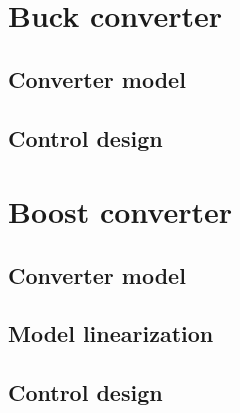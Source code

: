\documentclass{article}
\begin{document}
\section{Buck converter}
\subsection{Converter model}
\subsection{Control design}

\section{Boost converter}
\subsection{Converter model}
\subsection{Model linearization}
\subsection{Control design}
\end{document}
